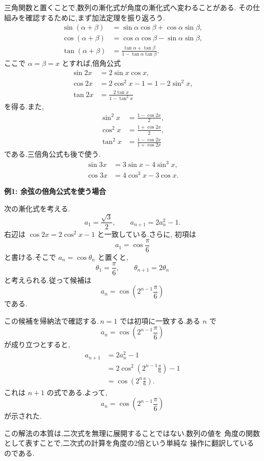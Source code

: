 三角関数と置くことで,数列の漸化式が角度の漸化式へ変わることがある.
その仕組みを確認するために,まず加法定理を振り返ろう.
\begin{align*}
  \sin(\alpha+\beta)
    &=\sin\alpha\cos\beta+\cos\alpha\sin\beta,\\
  \cos(\alpha+\beta)
    &=\cos\alpha\cos\beta-\sin\alpha\sin\beta,\\
  \tan(\alpha+\beta)
    &=\frac{\tan\alpha+\tan\beta}
            {1-\tan\alpha\tan\beta}.
\end{align*}
ここで $\alpha=\beta=x$ とすれば,倍角公式
\begin{align*}
  \sin 2x&=2\sin x\cos x,\\
  \cos 2x&=2\cos^2x-1=1-2\sin^2x,\\
  \tan 2x&=\frac{2\tan x}{1-\tan^2x}
\end{align*}
を得る.また,
\begin{align*}
  \sin^2x&=\frac{1-\cos 2x}{2},\\
  \cos^2x&=\frac{1+\cos 2x}{2},\\
  \tan^2x&=\frac{1-\cos 2x}{1+\cos 2x}
\end{align*}
である.三倍角公式も後で使う.
\begin{align*}
  \sin 3x&=3\sin x-4\sin^3x,\\
  \cos 3x&=4\cos^3x-3\cos x.
\end{align*}

\textbf{例1: 余弦の倍角公式を使う場合}

次の漸化式を考える.
\[
  a_1=\frac{\sqrt{3}}{2},
  \qquad
  a_{n+1}=2a_n^2-1.
  \tag{2.7.3}
\]
右辺は $\cos 2x=2\cos^2x-1$ と一致している.さらに,
初項は
\[
  a_1=\cos\frac{\pi}{6}
\]
と書ける.そこで $a_n=\cos\theta_n$ と置くと,
\[
  \theta_1=\frac{\pi}{6},
  \qquad
  \theta_{n+1}=2\theta_n
\]
と考えられる.従って候補は
\[
  a_n=\cos\left(2^{n-1}\frac{\pi}{6}\right)
  \tag{2.7.4}
\]
である.

この候補を帰納法で確認する.\,$n=1$ では初項に一致する.ある $n$ で
\[
  a_n=\cos\left(2^{n-1}\frac{\pi}{6}\right)
\]
が成り立つとすると,
\begin{align*}
  a_{n+1}
    &=2a_n^2-1\\
    &=2\cos^2\left(2^{n-1}\frac{\pi}{6}\right)-1\\
    &=\cos\left(2^n\frac{\pi}{6}\right).
\end{align*}
これは $n+1$ の式である.よって,
\[
  a_n=\cos\left(2^{n-1}\frac{\pi}{6}\right)
\]
が示された.

この解法の本質は,二次式を無理に展開することではない.数列の値を
角度の関数として表すことで,二次式の計算を角度の2倍という単純な
操作に翻訳しているのである.

